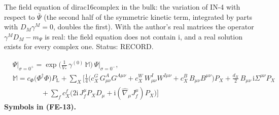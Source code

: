 \documentclass[
  10pt,
]{article}
\begin{document}
The field equation of dirac16complex in the bulk: the variation of IN-4
with respect to \(\bar\Psi\) (the second half of the symmetric kinetic
term, integrated by parts with \(D_M\gamma^M = 0\), doubles the first).
With the author's real matrices the operator \(\gamma^MD_M - m_\Psi\) is
real: the field equation does not contain \(\mathrm{i}\), and a real
solution exists for every complex one. Status: RECORD.

\[
\begin{aligned}
&\Psi\big\vert_{\sigma=0^+} = \exp\Big(\frac{1}{V_*}\,\gamma^{(0)}\,\mathbb{M}\Big)\,\Psi\big\vert_{\sigma=0^-},\\
&\mathbb{M} = c_\Phi\big(\Phi^\dagger\Phi\big)P_{\mathrm{L}} + \sum_X\Big[\frac14\big(c^{G}_X\,G^A_{\mu\nu}G^{A\mu\nu}
 + c^{W}_X\,W^I_{\mu\nu}W^{I\mu\nu} + c^{B}_X\,B_{\mu\nu}B^{\mu\nu}\big)P_X + \frac{d_X}{2}\,B_{\mu\nu}\,\mathrm{i}\Sigma^{\mu\nu}P_X\\
&\qquad\qquad + \sum_f c^{f}_X\big(2\mathrm{i}\,J_f^\mu P_XD_\mu + \mathrm{i}(\hat\nabla_\mu J_f^\mu)P_X\big)\Big]
\end{aligned} \tag{FE-13}
\] \textbf{Symbols in (FE-13).}
\end{document}
